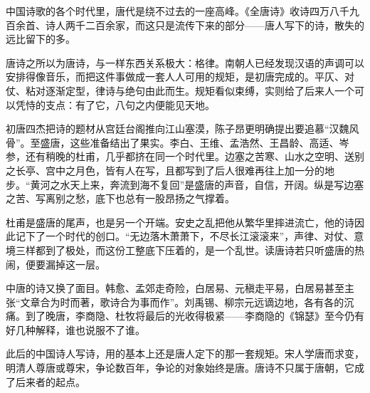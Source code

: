 
\begin{intro}
中国诗歌的各个时代里，唐代是绕不过去的一座高峰。《全唐诗》收诗四万八千九百余首、诗人两千二百余家，而这只是流传下来的部分——唐人写下的诗，散失的远比留下的多。

唐诗之所以为唐诗，与一样东西关系极大：格律。南朝人已经发现汉语的声调可以安排得像音乐，而把这件事做成一套人人可用的规矩，是初唐完成的。平仄、对仗、粘对逐渐定型，律诗与绝句由此而生。规矩看似束缚，实则给了后来人一个可以凭恃的支点：有了它，八句之内便能见天地。

初唐四杰把诗的题材从宫廷台阁推向江山塞漠，陈子昂更明确提出要追慕“汉魏风骨”。至盛唐，这些准备结出了果实。李白、王维、孟浩然、王昌龄、高适、岑参，还有稍晚的杜甫，几乎都挤在同一个时代里。边塞之苦寒、山水之空明、送别之长亭、宫中之月色，皆有人在写，且都写到了后人很难再往上加一分的地步。“黄河之水天上来，奔流到海不复回”是盛唐的声音，自信，开阔。纵是写边塞之苦、写离别之愁，底下也总有一股昂扬之气撑着。

杜甫是盛唐的尾声，也是另一个开端。安史之乱把他从繁华里摔进流亡，他的诗因此记下了一个时代的创口。“无边落木萧萧下，不尽长江滚滚来”，声律、对仗、意境三样都到了极处，而这份工整底下压着的，是一个乱世。读唐诗若只听盛唐的热闹，便要漏掉这一层。

中唐的诗又换了面目。韩愈、孟郊走奇险，白居易、元稹走平易，白居易甚至主张“文章合为时而著，歌诗合为事而作”。刘禹锡、柳宗元远谪边地，各有各的沉痛。到了晚唐，李商隐、杜牧将最后的光收得极紧——李商隐的《锦瑟》至今仍有好几种解释，谁也说服不了谁。

此后的中国诗人写诗，用的基本上还是唐人定下的那一套规矩。宋人学唐而求变，明清人尊唐或尊宋，争论数百年，争论的对象始终是唐。唐诗不只属于唐朝，它成了后来者的起点。
\end{intro}
